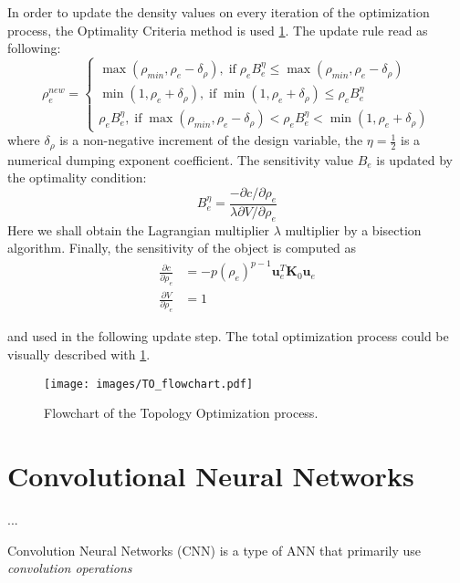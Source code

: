 In order to update the density values on every iteration of the optimization process, the Optimality Criteria method is used \ref{}.
The update rule read as following:
\[ \rho^{new}_{e} = 
\begin{cases}
	\max(\rho_{min},\rho_{e}-\delta_{\rho}) , \; \mathrm{if} \; \rho_{e}B^{\eta}_{e} \leq \max(\rho_{min},\rho_{e}-\delta_{\rho}) \\
	\min(1,\rho_{e}+\delta_{\rho}), \; \mathrm{if} \; \min(1,\rho_{e}+\delta_{\rho}) \leq \rho_{e}B^{\eta}_{e}\\
	\rho_{e}B^{\eta}_{e}, \; \mathrm{if} \; \max(\rho_{min},\rho_{e}-\delta_{\rho}) < \rho_{e}B^{\eta}_{e} < \min(1,\rho_{e}+\delta_{\rho}) 
\end{cases}
\]
where $\delta_{\rho}$ is a non-negative increment of the design variable, the $\eta = \frac{1}{2} $ is a numerical dumping exponent coefficient.
The sensitivity value $B_{e}$ is updated by the optimality condition:
\begin{equation}
	B^{\eta}_{e} = \frac{-\partial c / \partial \rho_{e}}{\lambda \partial V / \partial \rho_{e}}
\end{equation}
Here we shall obtain the Lagrangian multiplier $\lambda$ multiplier by a bisection algorithm.
Finally, the sensitivity of the object is computed as 
\begin{align*}
	\frac{\partial c}{\partial \rho_{e}} & = -p(\rho_{e})^{p-1} \mathbf{u}^{T}_{e} \mathbf{K}_{0} \mathbf{u}_{e}\\
	\frac{\partial V}{\partial \rho_{e}} & = 1
\end{align*}

and used in the following update step.
The total optimization process could be visually described with \ref{fig:to_flow}.

\begin{figure}[]
	\texttt{[image: images/TO\_flowchart.pdf]}
	\caption{Flowchart of the Topology Optimization process.}
	\label{fig:to_flow}
\end{figure}




\section{Convolutional Neural Networks}

...

Convolution Neural Networks (CNN) is a type of ANN that primarily use \textit{convolution operations}

